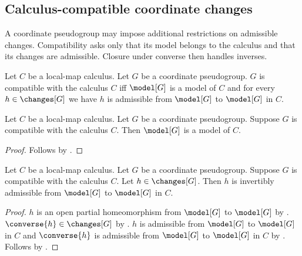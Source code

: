 \subsection{Calculus-compatible coordinate changes}

A coordinate pseudogroup may impose additional restrictions on admissible
changes. Compatibility asks only that its model belongs to the calculus and
that its changes are admissible. Closure under converse then handles inverses.

\begin{definition}\label{pseudogroup_calculus_compatible}
    Let $C$ be a local-map calculus.
    Let $G$ be a coordinate pseudogroup.
    $G$ is compatible with the calculus $C$ iff
        $\model[G]$ is a model of $C$ and
        for every $h\in\changes[G]$ we have
            $h$ is admissible from $\model[G]$ to $\model[G]$ in $C$.
\end{definition}

\begin{classification}\label{compatible_pseudogroup_model}
    Let $C$ be a local-map calculus.
    Let $G$ be a coordinate pseudogroup.
    Suppose $G$ is compatible with the calculus $C$.
    Then $\model[G]$ is a model of $C$.
\end{classification}
\begin{proof}
    Follows by .
\end{proof}

\begin{theorem}\label{compatible_pseudogroup_changes}
    Let $C$ be a local-map calculus.
    Let $G$ be a coordinate pseudogroup.
    Suppose $G$ is compatible with the calculus $C$.
    Let $h\in\changes[G]$.
    Then $h$ is invertibly admissible from $\model[G]$ to $\model[G]$ in $C$.
\end{theorem}
\begin{proof}
    $h$ is an open partial homeomorphism from $\model[G]$ to $\model[G]$ by
        .
    $\converse{h}\in\changes[G]$ by .
    $h$ is admissible from $\model[G]$ to $\model[G]$ in $C$ and
        $\converse{h}$ is admissible from $\model[G]$ to $\model[G]$ in $C$ by
        .
    Follows by .
\end{proof}

